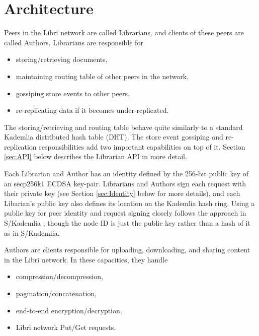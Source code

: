 \documentclass[10pt]{article}
\begin{document}
\section{Architecture}
\label{sec:arch}

Peers in the Libri network are called Librarians, and clients of these peers are called Authors. Librarians are responsible for 
\begin{itemize}
	\item storing/retrieving documents,
	\item maintaining routing table of other peers in the network,
	\item gossiping store events to other peers,
	\item re-replicating data if it becomes under-replicated.
\end{itemize}
The storing/retrieving and routing table behave quite similarly to a standard Kademlia \cite{kademlia} distributed hash table (DHT). The store event gossiping and re-replication responsibilities add two important capabilities on top of it. Section \ref{sec:API} below describes the Librarian API in more detail.

Each Librarian and Author has an identity defined by the 256-bit public key of an secp256k1 ECDSA key-pair. Librarians and Authors sign each request with their private key (see Section \ref{sec:Identity} below for more details), and each Libarian's public key also defines its location on the Kademlia hash ring. Using a public key for peer identity and request signing closely follows the approach in S/Kademlia \cite{skademlia}, though the node ID is just the public key rather than a hash of it as in S/Kademlia. 

Authors are clients responsible for uploading, downloading, and sharing content in the Libri network. In these capacities, they handle
\begin{itemize}
	\item compression/decompression,
	\item pagination/concatenation,
	\item end-to-end encryption/decryption,
	\item Libri network Put/Get requests.
\end{itemize}
\end{document}
